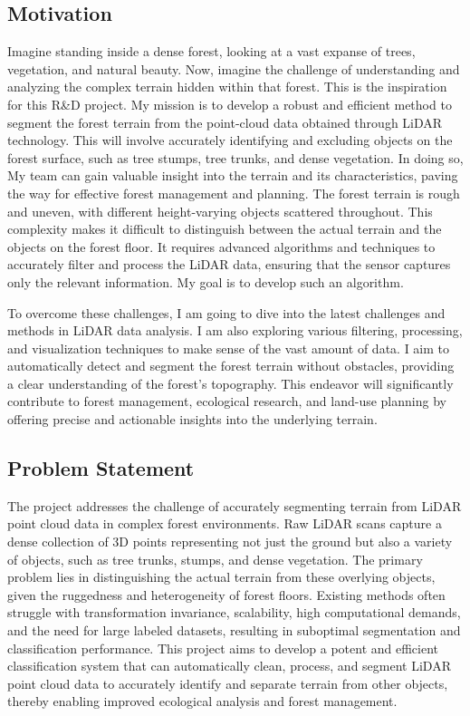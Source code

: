 \documentclass[../report.tex]{subfiles}
\begin{document}
    \subsection{Motivation}
    \label{sec:introduction:motivation}
Imagine standing inside a dense forest, looking at a vast expanse of trees, vegetation, and natural beauty. Now, imagine the challenge of understanding and analyzing the complex terrain hidden within that forest. This is the inspiration for this R\&D project. My mission is to develop a robust and efficient method to segment the forest terrain from the point-cloud data obtained through LiDAR technology. This will involve accurately identifying and excluding objects on the forest surface, such as tree stumps, tree trunks, and dense vegetation. In doing so, My team can gain valuable insight into the terrain and its characteristics, paving the way for effective forest management and planning.
{The forest terrain is rough and uneven, with different height-varying objects scattered throughout. This complexity makes it difficult to distinguish between the actual terrain and the objects on the forest floor. It requires advanced algorithms and techniques to accurately filter and process the LiDAR data, ensuring that the sensor captures only the relevant information. My goal is to develop such an algorithm.}

{To overcome these challenges, I am going to dive into the latest challenges and methods in LiDAR data analysis. I am also exploring various filtering, processing, and visualization techniques to make sense of the vast amount of data. I aim to automatically detect and segment the forest terrain without obstacles, providing a clear understanding of the forest's topography. This endeavor will significantly contribute to forest management, ecological research, and land-use planning by offering precise and actionable insights into the underlying terrain.}
    
    \subsection{Problem Statement}
    \label{sec:introduction:problem_statement}
The project addresses the challenge of accurately segmenting terrain from LiDAR point cloud data in complex forest environments. Raw LiDAR scans capture a dense collection of 3D points representing not just the ground but also a variety of objects, such as tree trunks, stumps, and dense vegetation. The primary problem lies in distinguishing the actual terrain from these overlying objects, given the ruggedness and heterogeneity of forest floors. Existing methods often struggle with transformation invariance, scalability, high computational demands, and the need for large labeled datasets, resulting in suboptimal segmentation and classification performance. This project aims to develop a potent and efficient classification system that can automatically clean, process, and segment LiDAR point cloud data to accurately identify and separate terrain from other objects, thereby enabling improved ecological analysis and forest management.
\end{document}
